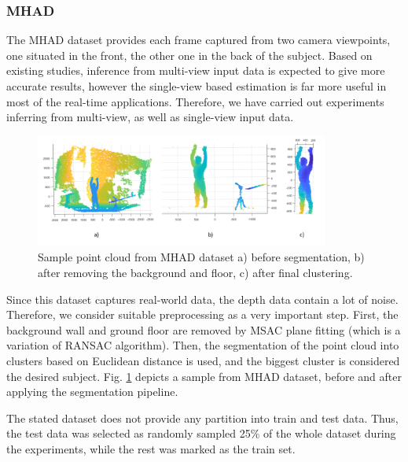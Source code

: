 \subsubsection{MHAD}
The MHAD dataset provides each frame captured from two camera viewpoints, one situated in the front, the other one in the back of the subject.
Based on existing studies, inference from multi-view input data is expected to give more accurate results, however the single-view based estimation is far more useful in most of the real-time applications. Therefore, we have carried out experiments inferring from multi-view, as well as single-view input data.\par
\vspace{5mm}

\begin{figure}[H]
\begin{center}
  \includegraphics[height=140px]{images/implementation/mhad.png}
  \caption[Sample point cloud from MHAD dataset \cite{Vidal:2013:BMC:2478277.2478412}.]{ Sample point cloud from MHAD dataset \cite{Vidal:2013:BMC:2478277.2478412} a) before segmentation, b) after removing the background and floor, c) after final clustering.}
  \label{fig:mhad}
\end{center}
\end{figure}

\noindent
Since this dataset captures real-world data, the depth data contain a lot of noise. Therefore, we consider suitable preprocessing as a very important step. First, the background wall and ground floor are removed by MSAC plane fitting (which is a variation of RANSAC algorithm). Then, the segmentation of the point cloud into clusters based on Euclidean distance is used, and the biggest cluster is considered the desired subject. Fig. \ref{fig:mhad} depicts a sample from MHAD dataset, before and after applying the segmentation pipeline.\par

\vspace{5mm}
\noindent
The stated dataset does not provide any partition into train and test data. Thus, the test data was selected as randomly sampled 25\% of the whole dataset during the experiments, while the rest was marked as the train set.


